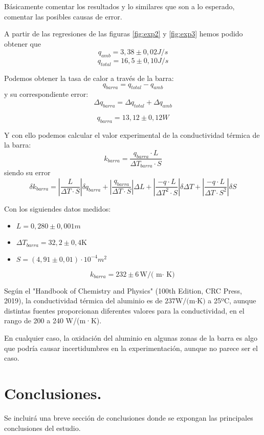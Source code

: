 \documentclass[a4paper,12pt,spanish]{article}
\begin{document}
	Básicamente comentar los resultados y lo similares que son a lo esperado, comentar las posibles causas de error.
	\fi
	
	A partir de las regresiones de las figuras \ref{fig:exp2} y \ref{fig:exp3} hemos podido obtener que
	\[ q_{amb} = 3,38 \pm 0,02 \si{J/s}
	\]
	\[ q_{total} = 16,5 \pm 0,10\si{J/s}
	\]
	
	Podemos obtener la tasa de calor a través de la barra:
	\[ q_{barra} = q_{total} - q_{amb}
	\]
	y su correspondiente error:
	\[\Delta q_{barra} =\Delta q_{total} + \Delta q_{amb}
	\]
	
	\[\boxed{q_{barra} = 13,12 \pm 0,12 \si{W}}
	\]
	
	Y con ello podemos calcular el valor experimental de la conductividad térmica de la barra:
	\[k_{barra} = \frac{q_{barra}\cdot L}{\Delta T_{barra}\cdot S}
	\]
	siendo su error
	\[\delta k_{barra} = \left|\frac{L}{\Delta T\cdot S}\right|\delta q_{barra} + \left| \frac{q_{barra}}{\Delta T \cdot S} \right|\Delta L +  \left| \frac{-q\cdot L}{\Delta T^2 \cdot S} \right| \delta \Delta T + \left| \frac{-q\cdot L}{\Delta T\cdot S^2} \right| \delta S   \] 
	
	Con los siguiendes datos medidos:
	\begin{itemize}
		\item $L= 0,280 \pm 0,001\si{m}$
		\item $\Delta T_{barra}= 32,2\pm 0,4 \text{K}$
		\item $S = (4,91\pm 0,01)\cdot10^{-4} \si{m^2}$
	\end{itemize}
	
	
	\[ \boxed{k_{barra} = 232 \pm 6  \text{W/( m$\cdot$ K)}     }
	\]
	
	
	Según el "Handbook of Chemistry and Physics" (100th Edition, CRC Press, 2019), la conductividad térmica del aluminio es de $237 \text{W/(m·K)}$ a 25ºC, aunque distintas fuentes proporcionan diferentes valores para la conductividad, en el rango de 200 a 240 W/(m·K).
	
	En cualquier caso, la oxidación del aluminio en algunas zonas de la barra es algo que podría causar incertidumbres en la experimentación, aunque no parece ser el caso.
	
	
	\section{Conclusiones.}
	
	\iffalse
	Se incluirá una breve sección de conclusiones donde se expongan las principales conclusiones del estudio.
	
\end{document}

